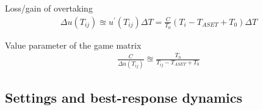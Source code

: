 Loss/gain of overtaking
\begin{align}
\Delta u(T_{ij}) \approxeq u^{\prime}(T_{ij}) \Delta T = \frac{C}{T_{0}} \left(T_{i} - T_{ASET} + T_{0}\right) \Delta T
\end{align}

Value parameter of the game matrix
\begin{align}
\frac{C}{\Delta u(T_{ij})} \approxeq \frac{T_{0}}{T_{ij} - T_{ASET} + T_{0}}
\end{align}

\subsection{Settings and best-response dynamics}


